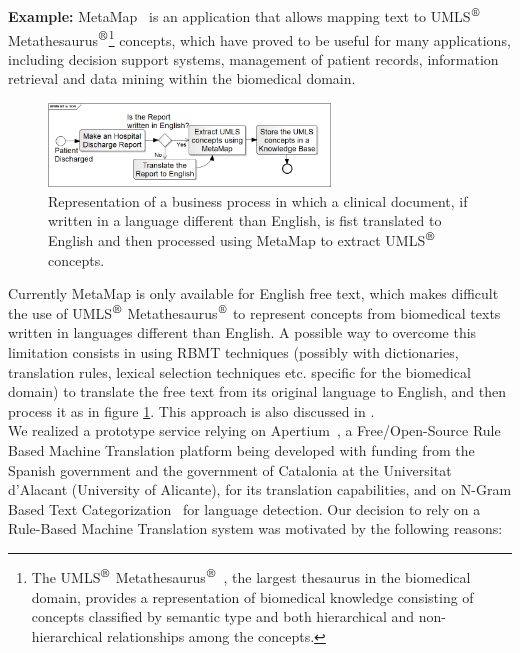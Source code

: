 \documentclass[11pt]{article}
\begin{document}
{\bf Example:} MetaMap~\citep{metamap} is an application that allows mapping text to UMLS$^{\mbox{\small\textregistered}}$ 
Metathesaurus$^{\mbox{\small\textregistered}}$\footnote{The UMLS$^{\mbox{\small\textregistered}}$ Metathesaurus$^{\mbox{\small\textregistered}}$~\citep{umls}, 
the largest thesaurus in the biomedical domain, provides a representation of biomedical knowledge consisting of concepts classified by semantic 
type and both hierarchical and non-hierarchical relationships among the concepts.} concepts, which have proved to be useful for many applications, 
including decision support systems, management of patient records, information retrieval and data mining within the biomedical domain.

\begin{figure}[!ht]
\begin{center}
\includegraphics[width=7.5cm]{mtsoa}
\end{center}
\caption{Representation of a business process in which a clinical document, if written in a language different than English, is fist translated
  to English and then processed using MetaMap to extract UMLS$^{\mbox{\small\textregistered}}$ concepts.}
\label{fig:mtsoa}
\end{figure}

Currently MetaMap is only available for English free text, which makes difficult the use of UMLS$^{\mbox{\small\textregistered}}$ 
Metathesaurus$^{\mbox{\small\textregistered}}$ to represent concepts from biomedical texts written in languages different than English.
A possible way to overcome this limitation consists in using RBMT techniques (possibly with dictionaries, translation rules, 
lexical selection techniques etc. specific for the biomedical domain) to translate the free text from its original language 
to English, and then process it as in figure \ref{fig:mtsoa}. This approach is also discussed in .\\

We realized a prototype service relying on Apertium~\citep{armentano05p}, a Free/Open-Source Rule Based Machine Translation platform being 
developed with funding from the Spanish government and the government of Catalonia at the Universitat d'Alacant (University of Alicante), 
for its translation capabilities, and on N-Gram Based Text Categorization~\citep{textcat} for language detection. Our decision to rely on a
Rule-Based Machine Translation system was motivated by the following reasons:
\end{document}
